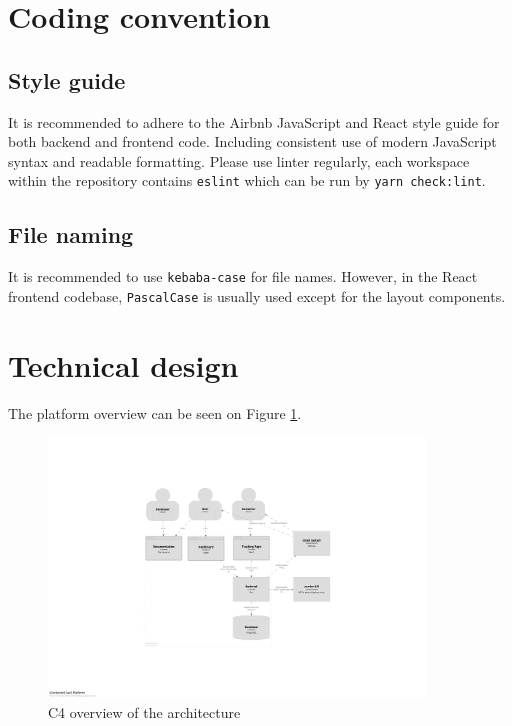 \section{Coding convention}
\label{attachments:programming-platform.coding-convention}
\subsection{Style guide}
It is recommended to adhere to the Airbnb JavaScript and React style guide for both backend and frontend code.
Including consistent use of modern JavaScript syntax and readable formatting.
Please use linter regularly, each workspace within the repository contains \texttt{eslint} which can be run by \texttt{yarn check:lint}.
\subsection{File naming}
It is recommended to use \texttt{kebaba-case} for file names.
However, in the React frontend codebase, \texttt{PascalCase} is usually used except for the layout components.

\section{Technical design}
\label{attachments:programming-platform.technical-design}

The platform overview can be seen on Figure \ref{imgdocs:programming-platform.technical-design}.

\begin{figure}[H]\centering
\includegraphics[width=100mm]{img/chap04/fig_architecture.png}
\caption{C4 overview of the architecture}
\label{imgdocs:programming-platform.technical-design}
\end{figure}


